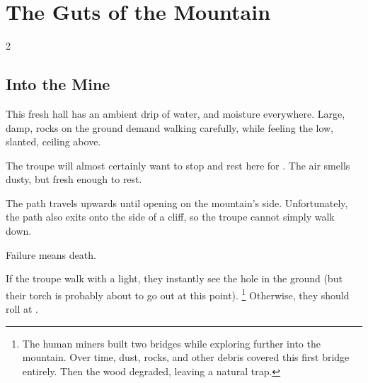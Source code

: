 \section{The Guts of the Mountain}

\begin{multicols}{2}

\renewcommand\npcsymbol{\glsentrysymbol{yonder}}

\subsection{Into the Mine}


\begin{boxtext}
  This fresh hall has an ambient drip of water, and moisture everywhere.
  Large, damp, rocks on the ground demand walking carefully, while feeling the low, slanted, ceiling above.
\end{boxtext}

The troupe will almost certainly want to stop and rest here for .
The air smells dusty, but fresh enough to rest.



The path travels upwards until opening on the mountain's side.
Unfortunately, the path also exits onto the side of a cliff, so the troupe cannot simply walk down.

Failure means death.



\playCommentaryAftermath[t]

If the troupe walk with a light, they instantly see the hole in the ground (but their torch is probably about to go out at this point).%
\footnote{The human miners built two bridges while exploring further into the mountain.
Over time, dust, rocks, and other debris covered this first bridge entirely.
Then the wood degraded, leaving a natural trap.}
Otherwise, they should roll  at \tn[8].


\end{multicols}
